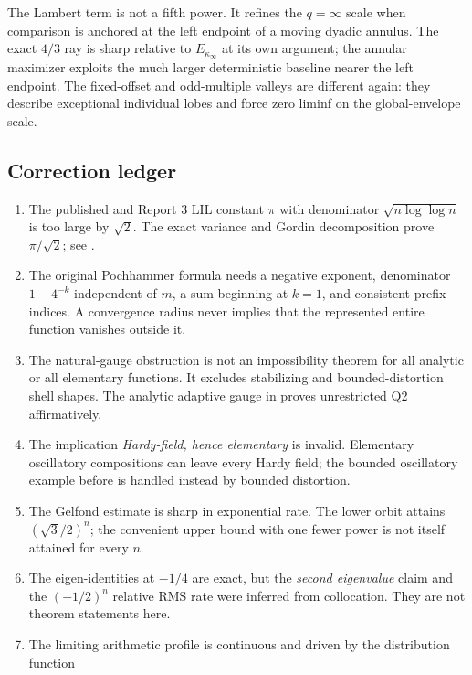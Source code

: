 \documentclass[11pt,oneside]{article}
\numberwithin{equation}{section}
\theoremstyle{definition}
\theoremstyle{remark}
\begin{document}
The Lambert term is not a fifth power.  It refines the $q=\infty$ scale when comparison is
anchored at the left endpoint of a moving dyadic annulus.  The exact $4/3$ ray is sharp
relative to $E_{\kappa_\infty}$ at its own argument; the annular maximizer exploits the much
larger deterministic baseline nearer the left endpoint.  The fixed-offset and odd-multiple
valleys are different again: they describe exceptional individual lobes and force zero
liminf on the global-envelope scale.

\subsection{Correction ledger}

\begin{enumerate}
\item The published and Report 3 LIL constant $\pi$ with denominator
      $\sqrt{n\log\log n}$ is too large by $\sqrt2$.  The exact variance and Gordin
      decomposition prove $\pi/\sqrt2$; see .
\item The original Pochhammer formula needs a negative exponent, denominator
      $1-4^{-k}$ independent of $m$, a sum beginning at $k=1$, and consistent prefix
      indices.  A convergence radius never implies that the represented entire function
      vanishes outside it.
\item The natural-gauge obstruction is not an impossibility theorem for all analytic or all
      elementary functions.  It excludes stabilizing and bounded-distortion shell shapes.
      The analytic adaptive gauge in  proves unrestricted Q2
      affirmatively.
\item The implication \emph{Hardy-field, hence elementary} is invalid.  Elementary
      oscillatory compositions can leave every Hardy field; the bounded oscillatory example
      before  is handled instead by bounded distortion.
\item The Gelfond estimate is sharp in exponential rate.  The lower orbit attains
      $(\sqrt3/2)^n$; the convenient upper bound with one fewer power is not itself attained
      for every $n$.
\item The eigen-identities at $-1/4$ are exact, but the \emph{second eigenvalue} claim and
      the $(-1/2)^n$ relative RMS rate were inferred from collocation.  They are not theorem
      statements here.
\item The limiting arithmetic profile is continuous and driven by the distribution function

\end{enumerate}
\end{document}
